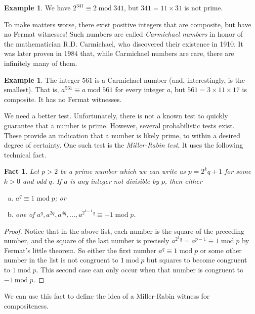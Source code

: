 \documentclass{book}
\theoremstyle{plain}
\newtheorem{fact}[theorem]{Fact}
\theoremstyle{definition}
\newtheorem{example}[theorem]{Example}
\renewcommand{\mod}{\operatorname{mod}}
\renewcommand{\mod}{\operatorname{mod}}
\begin{document}
\begin{example}
We have $2^{341} \equiv 2 \mod 341$, but $341 = 11 \times 31$ is not prime.
\end{example}

To make matters worse, there exist positive integers that are composite, but have no Fermat witnesses! Such numbers are called {\it Carmichael numbers} in honor of the mathematician R.D. Carmichael, who discovered their existence in 1910. It was later proven in 1984 that, while Carmichael numbers are rare, there are infinitely many of them.

\begin{example}
The integer $561$ is a Carmichael number (and, interestingly, is the smallest). That is, $a^{561} \equiv a \mod 561$ for every integer $a$, but $561 = 3 \times 11 \times 17$ is composite. It has no Fermat witnesses.
\end{example}

We need a better test. Unfortunately, there is not a known test to quickly guarantee that a number is prime. However, several probabilistic tests exist. These provide an indication that a number is likely prime, to within a desired degree of certainty. One such test is the {\it Miller-Rabin test}. It uses the following technical fact.

\begin{fact}
Let $p > 2$ be a prime number which we can write as $p = 2^kq + 1$ for some $k>0$ and odd $q$. If $a$ is any integer not divisible by $p$, then either
\begin{enumerate}[(a)]
\item $a^q \equiv 1 \mod p$; or
\item one of $a^q,a^{2q},a^{4q},\ldots,a^{2^{k-1}q} \equiv -1 \mod p$.
\end{enumerate}
\end{fact}

\begin{proof}
Notice that in the above list, each number is the square of the preceding number, and the square of the last number is precisely $a^{2^kq} = a^{p-1} \equiv 1 \mod p$ by Fermat's little theorem. So either the first number $a^q \equiv 1 \mod p$ or some other number in the list is not congruent to $1 \mod p$ but squares to become congruent to $1 \mod p$. This second case can only occur when that number is congruent to $-1 \mod p$.
\end{proof}

We can use this fact to define the idea of a Miller-Rabin witness for compositeness.
\end{document}
